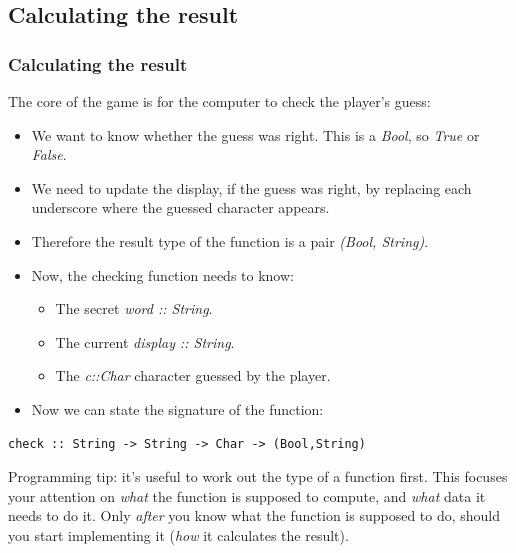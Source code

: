 \documentclass{beamer}
\begin{document}
\subsection{Calculating the result}
\begin{frame}[fragile]

\frametitle{Calculating the result}

The core of the game is for the computer to check the player's guess:

\begin{itemize}
\item We want to know whether the guess was right.  This is a
    \emph{Bool}, so \emph{True} or \emph{False}.
\item We need to update the display, if the guess was right, by
  replacing each underscore where the guessed character appears.
\item Therefore the result type of the function is a pair \emph{(Bool,
  String)}.
\item Now, the checking function
  needs to know:
  \begin{itemize}
  \item The secret \emph{word :: String}.
  \item The current \emph{display :: String}.
  \item The \emph{c::Char} character guessed by the player.
  \end{itemize}
\item Now we can state the signature of the function:
\end{itemize}

\begin{verbatim}
check :: String -> String -> Char -> (Bool,String)
\end{verbatim}

{\bluetext Programming tip: it's useful to work out the type of a
  function first.  This focuses your attention on \emph{what} the
  function is supposed to compute, and \emph{what} data it needs to
  do it.  Only \emph{after} you know what the function is supposed
  to do, should you start implementing it (\emph{how} it calculates
  the result).}

\end{frame}
\end{document}
